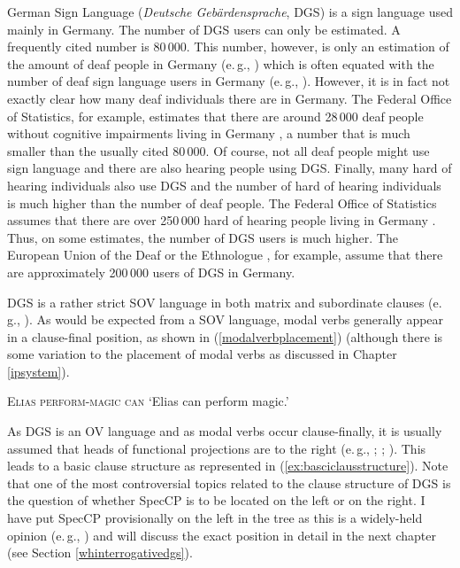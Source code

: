 German Sign Language (\textit{Deutsche Gebärdensprache}, DGS) is a sign language used mainly in Germany. The number of DGS users can only be estimated. A frequently cited number is 80\,000. This number, however, is only an estimation of the amount of deaf people in Germany (e.\,g., \citealt{dgb}) which is often equated with the number of deaf sign language users in Germany (e.\,g., \citealt{herrmann2007,schwagerzeshan2010}). However, it is in fact not exactly clear how many deaf individuals there are in Germany. The Federal Office of Statistics, for example, estimates that there are around 28\,000 deaf people without cognitive impairments living in Germany \citep{schwerbehindertenstatistik2017}, a number that is much smaller than the usually cited 80\,000. Of course, not all deaf people might use sign language and there are also hearing people using DGS. Finally, many hard of hearing individuals also use DGS and the number of hard of hearing individuals is much higher than the number of deaf people. The Federal Office of Statistics assumes that there are over 250\,000 hard of hearing people living in Germany \citep{schwerbehindertenstatistik2017}. Thus, on some estimates, the number of DGS users is much higher. The European Union of the Deaf \citep{eud2012} or the Ethnologue \citep{simons2018ethnologue}, for example, assume that there are approximately 200\,000 users of DGS in Germany.

DGS is a rather strict SOV language in both matrix and subordinate clauses (e.\,g., \citealt{keller1998aspekte, pfau2001pseudo}). As would be expected from a SOV language, modal verbs generally appear in a clause-final position, as shown in (\ref{modalverbplacement}) (although there is some variation to the placement of modal verbs as discussed in Chapter \ref{ipsystem}). 


\begin{exe}
\ex \textsc{Elias perform-magic can}
\glt `Elias can perform magic.'\label{modalverbplacement}
\end{exe}

\noindent As DGS is an OV language and as modal verbs occur clause-finally, it is usually assumed that heads of functional projections are to the right (e.\,g.,  \citealt[365]{sandler2006sign}; \citealt[17]{herrmann2013modal}; \citealt[3]{bross2017scope}). This leads to a basic clause structure as represented in (\ref{ex:basciclausstructure}). Note that one of the most controversial topics related to the clause structure of DGS is the question of whether SpecCP is to be located on the left or on the right. I have put SpecCP provisionally on the left in the tree as this is a widely-held opinion (e.\,g., \citealt{herrmann2013modal}) and will discuss the exact position in detail in the next chapter (see Section \ref{whinterrogativedgs}).

